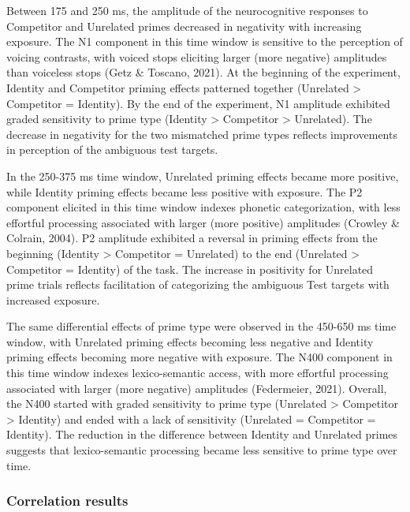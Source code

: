 \documentclass[
  12pt,
  twoside]{article}
\begin{document}
Between 175 and 250 ms, the amplitude of the neurocognitive responses to Competitor and Unrelated primes decreased in negativity with increasing exposure.
The N1 component in this time window is sensitive to the perception of voicing contrasts, with voiced stops eliciting larger (more negative) amplitudes than voiceless stops (Getz \& Toscano, 2021).
At the beginning of the experiment, Identity and Competitor priming effects patterned together (Unrelated \textgreater{} Competitor = Identity).
By the end of the experiment, N1 amplitude exhibited graded sensitivity to prime type (Identity \textgreater{} Competitor \textgreater{} Unrelated).
The decrease in negativity for the two mismatched prime types reflects improvements in perception of the ambiguous test targets.

In the 250-375 ms time window, Unrelated priming effects became more positive, while Identity priming effects became less positive with exposure.
The P2 component elicited in this time window indexes phonetic categorization, with less effortful processing associated with larger (more positive) amplitudes (Crowley \& Colrain, 2004).
P2 amplitude exhibited a reversal in priming effects from the beginning (Identity \textgreater{} Competitor = Unrelated) to the end (Unrelated \textgreater{} Competitor = Identity) of the task.
The increase in positivity for Unrelated prime trials reflects facilitation of categorizing the ambiguous Test targets with increased exposure.

The same differential effects of prime type were observed in the 450-650 ms time window, with Unrelated priming effects becoming less negative and Identity priming effects becoming more negative with exposure.
The N400 component in this time window indexes lexico-semantic access, with more effortful processing associated with larger (more negative) amplitudes (Federmeier, 2021).
Overall, the N400 started with graded sensitivity to prime type (Unrelated \textgreater{} Competitor \textgreater{} Identity) and ended with a lack of sensitivity (Unrelated = Competitor = Identity).
The reduction in the difference between Identity and Unrelated primes suggests that lexico-semantic processing became less sensitive to prime type over time.

\hypertarget{correlation-results}{%
\subsubsection{Correlation results}\label{correlation-results}}
\end{document}
